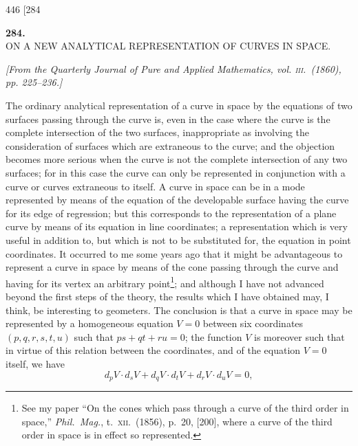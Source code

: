 \documentclass[11pt]{article}
\begin{document}
\bigskip
\begin{center}
446 \hfill \hfill \textsc{[284}
\end{center}

\begin{center}
\textbf{\large 284.}\\[1ex]
\textsc{ON A NEW ANALYTICAL REPRESENTATION OF CURVES IN SPACE.}
\end{center}

\begin{center}
\textit{[From the Quarterly Journal of Pure and Applied Mathematics, vol. \textsc{iii}.\ (1860),
pp. 225--236.]}
\end{center}

\medskip

The ordinary analytical representation of a curve in space by the equations of
two surfaces passing through the curve is, even in the case where the curve is the
complete intersection of the two surfaces, inappropriate as involving the consideration
of surfaces which are extraneous to the curve; and the objection becomes more serious
when the curve is not the complete intersection of any two surfaces; for in this case
the curve can only be represented in conjunction with a curve or curves extraneous
to itself. A curve in space can be in a mode represented by means of the equation
of the developable surface having the curve for its edge of regression; but this
corresponds to the representation of a plane curve by means of its equation in line
coordinates; a representation which is very useful in addition to, but which is not
to be substituted for, the equation in point coordinates. It occurred to me some
years ago that it might be advantageous to represent a curve in space by means of the
cone passing through the curve and having for its vertex an arbitrary
point\footnote{See my paper ``On the cones which pass through a curve of the third
order in space,'' \textit{Phil.\ Mag.}, t.\ \textsc{xii}.\ (1856), p.\ 20, [200], where
a curve of the third order in space is in effect so represented.}; and although I
have not advanced beyond the first steps of the theory, the results which I have
obtained may, I think, be interesting to geometers. The conclusion is that a curve
in space may be represented by a homogeneous equation $V=0$ between six coordinates
$(p,q,r,s,t,u)$ such that $ps+qt+ru=0$; the function $V$ is moreover such that in
virtue of this relation between the coordinates, and of the equation $V=0$ itself,
we have
\[ d_{p}V\cdot d_{s}V+d_{q}V\cdot d_{t}V+d_{r}V\cdot d_{u}V=0, \]
\end{document}
